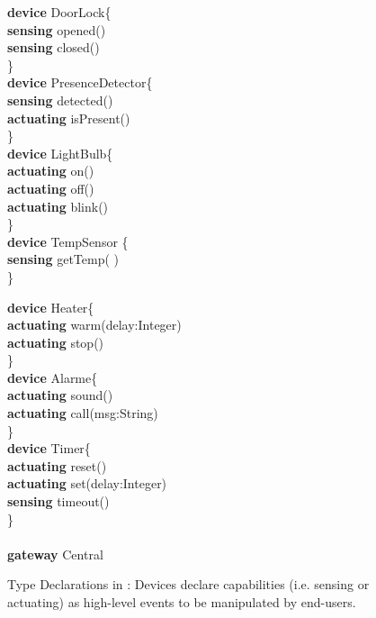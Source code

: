 \begin{figure}[t]%
	\begin{boxedminipage}[t]{\columnwidth}
	\begin{sffamily}
		\begin{tiny}
		\begin{minipage}[t]{0.5\columnwidth}
\textbf{device} DoorLock\{\\
   \phantom{M}\textbf{sensing} opened()\\
   \phantom{M}\textbf{sensing} closed()\\
\}\\
\textbf{device} PresenceDetector\{\\
   \phantom{M}\textbf{sensing} detected()\\
   \phantom{M}\textbf{actuating} isPresent()\\
\}\\
\textbf{device} LightBulb\{\\
   \phantom{M}\textbf{actuating} on()\\
   \phantom{M}\textbf{actuating} off()\\
   \phantom{M}\textbf{actuating} blink()\\
\}\\	
\textbf{device} TempSensor \{\\
   \phantom{M}\textbf{sensing} getTemp( )\\
\}
		\end{minipage}
		\hfill
		\begin{minipage}[t]{0.45\columnwidth}
\textbf{device} Heater\{\\
\phantom{M}\textbf{actuating} warm(delay:Integer)\\
\phantom{M}\textbf{actuating} stop()\\
\}\\
\textbf{device} Alarme\{\\
   \phantom{M}\textbf{actuating} sound()\\
   \phantom{M}\textbf{actuating} call(msg:String)\\
\}\\
\textbf{device} Timer\{\\
   \phantom{M}\textbf{actuating} reset()\\
   \phantom{M}\textbf{actuating} set(delay:Integer)\\
   \phantom{M}\textbf{sensing}   timeout()\\
\}\\\\
\textbf{gateway} Central\\		
		\end{minipage}
		\end{tiny}
	\end{sffamily}
	\end{boxedminipage}

	\caption{Type Declarations in \IOTDSL: Devices declare capabilities (i.e. sensing or actuating) as high-level events to be manipulated by end-users.}%
	\label{fig:RE-TypeDeclarations}%
\end{figure}



